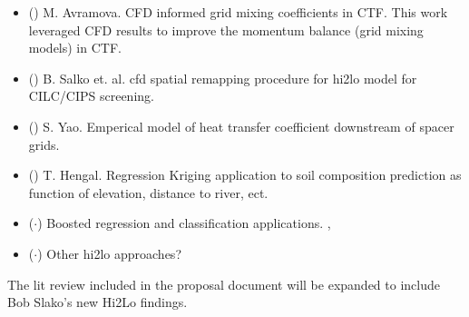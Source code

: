 \begin{itemize}
    \item (\checkmark) M. Avramova.  CFD informed grid mixing coefficients in CTF.  This work leveraged CFD results to improve the momentum balance (grid mixing models) in CTF. \cite{avramova2007}
    \item (\checkmark) B. Salko et. al. cfd spatial remapping procedure for hi2lo model for CILC/CIPS screening. \cite{salko17}
    \item (\checkmark) S. Yao.  Emperical model of heat transfer coefficient downstream of spacer grids. \cite{yao82}
    \item (\checkmark) T. Hengal. Regression Kriging application to soil composition prediction as function of elevation, distance to river, ect. \cite{Hengl07}
    \item ($\cdot$) Boosted regression and classification applications. \cite{moisen2006}, \cite{friedman2002}
    \item ($\cdot$) Other hi2lo approaches?
\end{itemize}

The lit review included in the proposal document will be expanded to include Bob Slako's new Hi2Lo findings.
